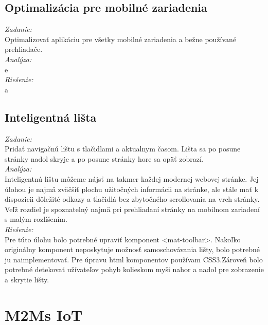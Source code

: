\documentclass[11pt, oneside]{report}
\begin{document}
\subsection*{Optimalizácia pre mobilné zariadenia}
\textit{Zadanie:}\\
Optimalizovať aplikáciu pre všetky mobilné zariadenia a bežne používané prehliadače.
\\\textit{Analýza:}\\
e
\\\textit{Riešenie:}\\
a
\subsection*{Inteligentná lišta }
\textit{Zadanie:}\\
Pridať navigačnú lištu s tlačidlami a aktualnym časom. Lišta sa po posune stránky nadol skryje a po posune stránky hore sa opäť zobrazí.
\\\textit{Analýza:}\\
Inteligentnú lištu môžeme nájsť na takmer každej modernej webovej stránke. Jej úlohou je najmä zväčšiť plochu užitočných informácii na stránke, ale stále mať k dispozicii dôležité odkazy a tlačidlá  bez  zbytočného scrollovania na vrch stránky. Veľž rozdiel je spoznatelný najmä pri prehliadaní stránky na mobilnom zariadení s malým rozlíšením. 
\\\textit{Riešenie:}\\
Pre túto úlohu bolo potrebné upraviť komponent \textsf{<mat-toolbar>}. Nakoľko originálny komponent neposkytuje možnosť samoschovávania lišty, bolo potrebné ju naimplementovať. Pre úpravu html komponentov používam CSS3.Zároveň bolo potrebné detekovať užívateľov pohyb kolieskom myši nahor a nadol pre zobrazenie a skrytie lišty.

\section{M2Ms IoT}


\newpage	


\thispagestyle{empty}
\nocite{*}
\clearpage

\printbibliography
\end{document}
